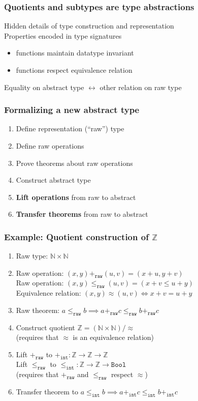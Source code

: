 \documentclass[english]{beamer}
\begin{document}
\begin{frame}
\frametitle{Quotients and subtypes are \textbf{type abstractions}}
Hidden details of type construction and representation\\
\bigskip
Properties encoded in type signatures
\begin{itemize}
\item functions maintain datatype invariant
\item functions respect equivalence relation
\end{itemize}
\bigskip
Equality on abstract type $\longleftrightarrow$ other relation on raw type
\end{frame}

\begin{frame}[fragile]
\frametitle{Formalizing a new abstract type}
\begin{enumerate}
\item Define representation (``raw'') type
\item Define raw operations
\item Prove theorems about raw operations
\item Construct abstract type
\item \textbf{Lift operations} from raw to abstract
\item \textbf{Transfer theorems} from raw to abstract
\end{enumerate}
\end{frame}

\begin{frame}
\frametitle{Example: Quotient construction of $\mathbb{Z}$}

\begin{enumerate}[<+->]
\item Raw type: $\mathbb{N} \times \mathbb{N}$
\item Raw operation: $(x, y) +_\mathtt{raw} (u, v) = (x+u, y+v)$\\
  Raw operation: $(x, y) \le_\mathtt{raw} (u, v) = (x+v \le u+y)$\\
  Equivalence relation: $(x, y) \approx (u, v) \Leftrightarrow x + v = u + y$
\item Raw theorem: $a \le_\mathtt{raw} b \implies a +_\mathtt{raw} c \le_\mathtt{raw} b +_\mathtt{raw} c$
\item Construct quotient $\mathbb{Z} = (\mathbb{N} \times \mathbb{N}) / \approx$\\
  (requires that $\approx$ is an equivalence relation)
\item Lift $+_\mathtt{raw}$ to $+_\mathtt{int} : \mathbb{Z} \to \mathbb{Z} \to \mathbb{Z}$\\
  Lift $\le_\mathtt{raw}$ to $\le_\mathtt{int} : \mathbb{Z} \to \mathbb{Z} \to \mathtt{Bool}$\\
  (requires that $+_\mathtt{raw}$ and $\le_\mathtt{raw}$ respect $\approx$)
\item Transfer theorem to $a \le_\mathtt{int} b \implies a +_\mathtt{int} c \le_\mathtt{int} b +_\mathtt{int} c$
\end{enumerate}
\bigskip
{}
\end{frame}
\end{document}
